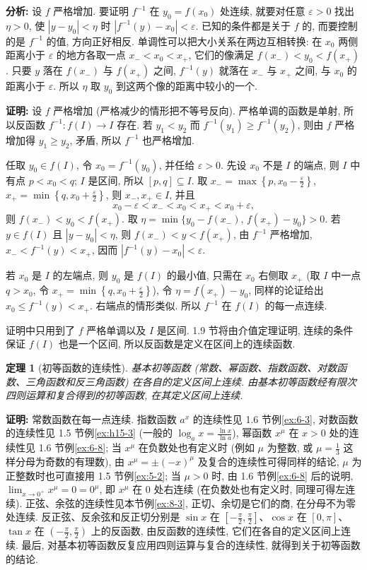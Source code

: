 \documentclass[UTF8,openany]{ctexbook}
\theoremstyle{chinesetextbook}
\newtheorem{theorem}{定理}[section]
\newenvironment{cnproof}{\par\indent\textbf{证明:} \ignorespaces}{\par}
\begin{document}
\par\indent\textbf{分析:} 设 $f$ 严格增加. 要证明 $f^{-1}$ 在 $y_0=f(x_0)$ 处连续, 就要对任意 $\varepsilon>0$ 找出 $\eta>0$, 使 $|y-y_0|<\eta$ 时 $|f^{-1}(y)-x_0|<\varepsilon$. 已知的条件都是关于 $f$ 的, 而要控制的是 $f^{-1}$ 的值, 方向正好相反. 单调性可以把大小关系在两边互相转换: 在 $x_0$ 两侧距离小于 $\varepsilon$ 的地方各取一点 $x_-<x_0<x_+$, 它们的像满足 $f(x_-)<y_0<f(x_+)$. 只要 $y$ 落在 $f(x_-)$ 与 $f(x_+)$ 之间, $f^{-1}(y)$ 就落在 $x_-$ 与 $x_+$ 之间, 与 $x_0$ 的距离小于 $\varepsilon$. 所以 $\eta$ 取 $y_0$ 到这两个像的距离中较小的一个.
\begin{cnproof}
设 $f$ 严格增加 (严格减少的情形把不等号反向). 严格单调的函数是单射, 所以反函数 $f^{-1}:f(I)\to I$ 存在. 若 $y_1<y_2$ 而 $f^{-1}(y_1)\ge f^{-1}(y_2)$, 则由 $f$ 严格增加得 $y_1\ge y_2$, 矛盾, 所以 $f^{-1}$ 也严格增加.

任取 $y_0\in f(I)$, 令 $x_0=f^{-1}(y_0)$, 并任给 $\varepsilon>0$. 先设 $x_0$ 不是 $I$ 的端点, 则 $I$ 中有点 $p<x_0<q$; $I$ 是区间, 所以 $[p,q]\subseteq I$. 取 $\displaystyle x_-=\max\left\{p,x_0-\frac\varepsilon2\right\}$, $\displaystyle x_+=\min\left\{q,x_0+\frac\varepsilon2\right\}$, 则 $x_-,x_+\in I$, 并且
\[
x_0-\varepsilon<x_-<x_0<x_+<x_0+\varepsilon,
\]
则 $f(x_-)<y_0<f(x_+)$. 取 $\eta=\min\{y_0-f(x_-),\,f(x_+)-y_0\}>0$. 若 $y\in f(I)$ 且 $|y-y_0|<\eta$, 则 $f(x_-)<y<f(x_+)$, 由 $f^{-1}$ 严格增加, $x_-<f^{-1}(y)<x_+$, 因而 $|f^{-1}(y)-x_0|<\varepsilon$.

若 $x_0$ 是 $I$ 的左端点, 则 $y_0$ 是 $f(I)$ 的最小值, 只需在 $x_0$ 右侧取 $x_+$ (取 $I$ 中一点 $q>x_0$, 令 $\displaystyle x_+=\min\left\{q,x_0+\frac\varepsilon2\right\}$), 令 $\eta=f(x_+)-y_0$, 同样的论证给出 $x_0\le f^{-1}(y)<x_+$. 右端点的情形类似. 所以 $f^{-1}$ 在 $f(I)$ 的每一点连续.
\end{cnproof}
证明中只用到了 $f$ 严格单调以及 $I$ 是区间. 1.9 节将由介值定理证明, 连续的条件保证 $f(I)$ 也是一个区间, 所以反函数是定义在区间上的连续函数.
\begin{theorem}[初等函数的连续性]
基本初等函数 (常数、幂函数、指数函数、对数函数、三角函数和反三角函数) 在各自的定义区间上连续. 由基本初等函数经有限次四则运算和复合得到的初等函数, 在其定义区间上连续.
\end{theorem}
\begin{cnproof}
常数函数在每一点连续. 指数函数 $a^x$ 的连续性见 1.6 节例\ref{ex:6-3}, 对数函数的连续性见 1.5 节例\ref{ex:h15-3} (一般的 $\displaystyle\log_ax=\frac{\ln x}{\ln a}$), 幂函数 $x^\mu$ 在 $x>0$ 处的连续性见 1.6 节例\ref{ex:6-8}; 当 $x^\mu$ 在负数处也有定义时 (例如 $\mu$ 为整数, 或 $\displaystyle\mu=\frac13$ 这样分母为奇数的有理数), 由 $x^\mu=\pm(-x)^\mu$ 及复合的连续性可得同样的结论, $\mu$ 为正整数时也可直接用 1.5 节例\ref{ex:5-2}; 当 $\mu>0$ 时, 由 1.6 节例\ref{ex:6-8} 后的说明, $\displaystyle\lim_{x\to0^+}x^\mu=0=0^\mu$, 即 $x^\mu$ 在 $0$ 处右连续 (在负数处也有定义时, 同理可得左连续). 正弦、余弦的连续性见本节例\ref{ex:8-3}, 正切、余切是它们的商, 在分母不为零处连续. 反正弦、反余弦和反正切分别是 $\sin x$ 在 $\displaystyle\left[-\frac\pi2,\frac\pi2\right]$、$\cos x$ 在 $[0,\pi]$、$\tan x$ 在 $\displaystyle\left(-\frac\pi2,\frac\pi2\right)$ 上的反函数, 由反函数的连续性, 它们在各自的定义区间上连续. 最后, 对基本初等函数反复应用四则运算与复合的连续性, 就得到关于初等函数的结论.
\end{cnproof}
\end{document}
